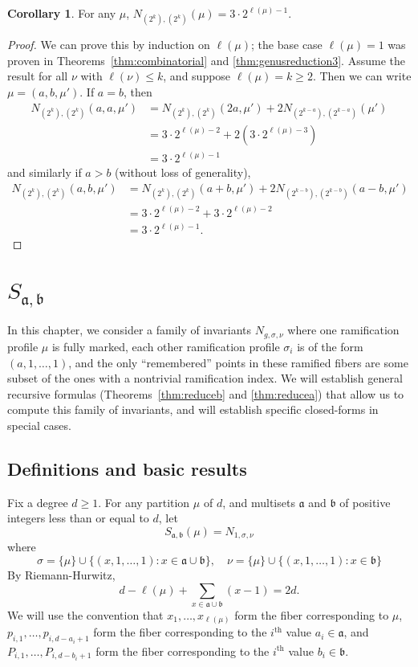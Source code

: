 \documentclass[thesis]{thesis-umich}           %
\renewcommand{\a}{\mathfrak a}
\renewcommand{\b}{\mathfrak b}
\theoremstyle{definition}
\newtheorem{cor}[thm]{Corollary}
\begin{document}
\begin{cor}
  \label{cor:twos}
  For any $\mu$, $N_{(2^k),(2^k)}(\mu)=3\cdot 2^{\ell(\mu)-1}$.
\end{cor}
\begin{proof}
  We can prove this by induction on $\ell(\mu)$; the base case $\ell(\mu)=1$ was proven in Theorems~\ref{thm:combinatorial} and \ref{thm:genusreduction3}. Assume
  the result for all $\nu$ with $\ell(\nu)\leq k$, and suppose $\ell(\mu)=k\geq 2$.
  Then we can write $\mu=(a,b,\mu')$. If $a=b$, then
  \begin{align*}
    N_{(2^k),(2^k)}(a,a,\mu') &= N_{(2^k),(2^k)}(2a,\mu')+2N_{(2^{k-a}),(2^{k-a})}(\mu') \\
    &=3\cdot 2^{\ell(\mu)-2}+2(3\cdot 2^{\ell(\mu)-3}) \\
    &=3\cdot 2^{\ell(\mu)-1}
  \end{align*}
  and similarly if $a>b$ (without loss of generality),
    \begin{align*}
      N_{(2^k),(2^k)}(a,b,\mu') &= N_{(2^k),(2^k)}(a+b,\mu')+2N_{(2^{k-b}),(2^{k-b})}(a-b,\mu') \\
      &= 3\cdot 2^{\ell(\mu)-2}+3\cdot 2^{\ell(\mu)-2} \\
      &= 3\cdot 2^{\ell(\mu)-1}.
  \end{align*}
  \end{proof}

\chapter{$S_{\a,\b}$}

In this chapter, we consider a family of invariants $N_{g,\sigma,\nu}$ where
one ramification profile
$\mu$ is fully marked,
each other ramification profile $\sigma_i$ is of the form $(a,1,\dots,1)$, and
the only ``remembered'' points in these ramified fibers are some subset of the ones with
a nontrivial ramification index. We will establish general recursive formulas
(Theorems~\ref{thm:reduceb} and \ref{thm:reducea})
that allow us to compute this family of invariants, and will establish
specific closed-forms in special cases.


\section{Definitions and basic results}

Fix a degree $d\geq 1$. For any partition $\mu$ of $d$, and multisets $\a$ and $\b$ of
positive integers less than or equal to $d$, let
\[
S_{\a,\b}(\mu)=N_{1,\sigma,\nu}
\]
where
\[
\sigma=\{\mu\}\cup\{(x,1,\dots,1):x\in\a\cup\b\},\quad \nu=\{\mu\}\cup\{(x,1,\dots,1):x\in\b\}
\]
By Riemann-Hurwitz,
\[
d-\ell(\mu)+\sum_{x\in\a\cup\b}(x-1)=2d.
\]
We will use the convention that $x_1,\dots,x_{\ell(\mu)}$
form the fiber corresponding to $\mu$, $p_{i,1},\dots,p_{i,d-a_i+1}$ form
the fiber corresponding to the $i^{\text{th}}$ value $a_i\in\a$, and
$P_{i,1},\dots,P_{i,d-b_i+1}$ form the fiber corresponding to the
$i^{\text{th}}$ value $b_i\in\b$.
\end{document}
